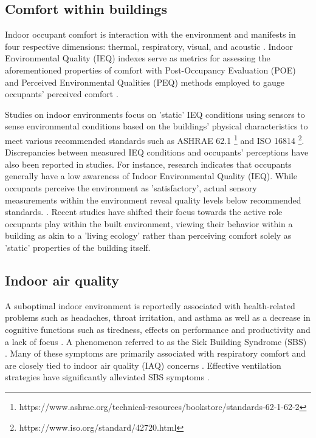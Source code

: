 \subsection{Comfort within buildings}
\label{sec:poe}

Indoor occupant comfort is interaction with the environment and manifests in four respective dimensions: thermal, respiratory, visual, and acoustic \cite{alavi_comfort_2017}. Indoor Environmental Quality (IEQ) \cite{kulshreshtha_indoor_2024} indexes serve as metrics for assessing the aforementioned properties of comfort with Post-Occupancy Evaluation (POE) \cite{elsayed_post-occupancy_2023} and Perceived Environmental Qualities (PEQ) \cite{son_perceived_2023} methods employed to gauge occupants' perceived comfort \cite{boissonneault_concepts_2023}. 

Studies on indoor environments focus on 'static' IEQ conditions using sensors to sense environmental conditions based on the buildings' physical characteristics to meet various recommended standards such as ASHRAE 62.1 \footnote{https://www.ashrae.org/technical-resources/bookstore/standards-62-1-62-2} and ISO 16814 \footnote{https://www.iso.org/standard/42720.html}. Discrepancies between measured IEQ conditions and occupants' perceptions have also been reported in studies. For instance, research indicates that occupants generally have a low awareness of Indoor Environmental Quality (IEQ). While occupants perceive the environment as 'satisfactory', actual sensory measurements within the environment reveal quality levels below recommended standards. \cite{son_perceived_2023}. Recent studies have shifted their focus towards the active role occupants play within the built environment, viewing their behavior within a building as akin to a 'living ecology' \cite{langevin_quantifying_2016} rather than perceiving comfort solely as 'static' properties of the building itself. 


\subsection{Indoor air quality}
\label{sec:iaq}

A suboptimal indoor environment is reportedly associated with health-related problems such as headaches, throat irritation, and asthma \cite{klepeis_national_2001} as well as a decrease in cognitive functions such as tiredness, effects on performance and productivity and a lack of focus \cite{wang_how_2021} \cite{du_indoor_2020}. A phenomenon referred to as the Sick Building Syndrome (SBS) \cite{gawande_indoor_2020, passarelli_sick_2009}. Many of these symptoms are primarily associated with respiratory comfort and are closely tied to indoor air quality (IAQ) concerns \cite{kim_analyzing_2019}. Effective ventilation strategies
have significantly alleviated SBS symptoms \cite{gawande_indoor_2020}.

